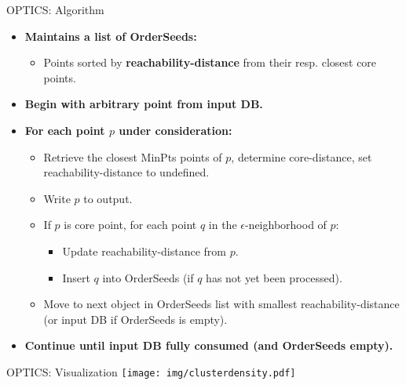 \begin{frame}{OPTICS: Algorithm}
	\begin{itemize}
		\item \textbf{Maintains a list of {\color{airforceblue}OrderSeeds}:}
		      \begin{itemize}
			      \item Points sorted by \textbf{reachability-distance} from their
			            resp. closest core points.
		      \end{itemize}
		\item \textbf{Begin with arbitrary point from input DB.}
		\item \textbf{For each point $p$ under consideration:}
		      \begin{itemize}
			      \item Retrieve the closest MinPts points of $p$, determine
			            core-distance, set reachability-distance to undefined.
			      \item Write $p$ to output.
			      \item If $p$ is core point, for each point $q$ in the
			            $\epsilon$-neighborhood of $p$:
			            \begin{itemize}
				            \item Update reachability-distance from $p$.
				            \item Insert $q$ into OrderSeeds (if $q$ has not yet been
				                  processed).
			            \end{itemize}
			      \item Move to next object in OrderSeeds list with smallest
			            reachability-distance (or input DB if OrderSeeds is empty).
		      \end{itemize}
		\item \textbf{Continue until input DB fully consumed (and OrderSeeds
			      empty).}
	\end{itemize}
\end{frame}

\begin{frame}{OPTICS: Visualization}
	\centering
	\texttt{[image: img/clusterdensity.pdf]}
\end{frame}

